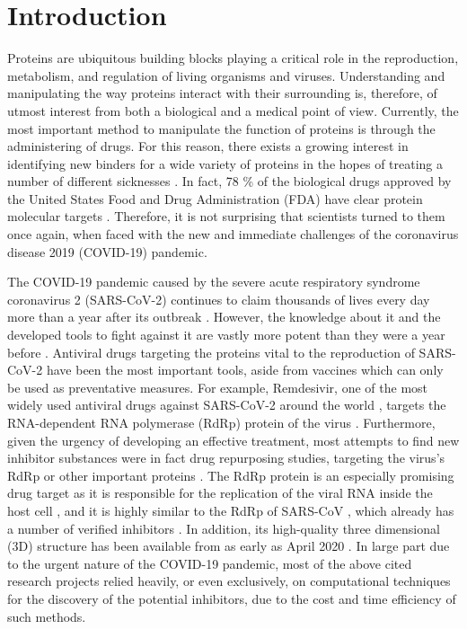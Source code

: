 \section{Introduction}

Proteins are ubiquitous building blocks playing a critical role in the reproduction, metabolism, and regulation of living organisms and viruses. Understanding and manipulating the way proteins interact with their surrounding is, therefore, of utmost interest from both a biological and a medical point of view. Currently, the most important method to manipulate the function of proteins is through the administering of drugs. For this reason, there exists a growing interest in identifying new binders for a wide variety of proteins in the hopes of treating a number of different sicknesses \cite{24clusters-vina,clusters_vina2,ensemble_screening,autodock_screen,tubercolosis_screen,cancer_inhibitor, vina_theory_practice}. In fact, 78 \% of the biological drugs approved by the United States Food and Drug Administration (FDA) have clear protein molecular targets \cite{how_many_targets}. Therefore, it is not surprising that scientists turned to them once again, when faced with the new and immediate challenges of the coronavirus disease 2019 (COVID-19) pandemic.    

The COVID-19 pandemic caused by the severe acute respiratory syndrome coronavirus 2 (SARS-CoV-2) continues to claim thousands of lives every day more than a year after its outbreak \cite{owidcoronavirus}.
However, the knowledge about it and the developed tools to fight against it are vastly more potent than they were a year before \cite{covid_review}.
Antiviral drugs targeting the proteins vital to the reproduction of SARS-CoV-2 have been the most important tools, aside from vaccines which can only be used as preventative measures.
For example, Remdesivir, one of the most widely used antiviral drugs against SARS-CoV-2 around the world \cite{remdesivir_meta}, targets the RNA-dependent RNA polymerase (RdRp) protein of the virus \cite{remdesivir_final}.
Furthermore, given the urgency of developing an effective treatment, most attempts to find new inhibitor substances were in fact drug repurposing studies, targeting the virus's RdRp \cite{rdrp,rdrp_virtual_screening,rdrp_virtual_screening2,rdrp_virtual_screening3,ml_inhibitors} or other important proteins \cite{ensemble_3clpro,main_protease_vs,3covid_proteins,papain-like}.
The RdRp protein is an especially promising drug target as it is responsible for the replication of the viral RNA inside the host cell \cite{rdrp_model}, and it is highly similar to the RdRp of SARS-CoV \cite{hcq_inhibitor}, which already has a number of verified inhibitors \cite{covid_proteins}. In addition, its high-quality three dimensional (3D) structure has been available from as early as April 2020 \cite{rdrp_structure}. In large part due to the urgent nature of the COVID-19 pandemic, most of the above cited research projects relied heavily, or even exclusively, on computational techniques for the discovery of the potential inhibitors, due to the cost and time efficiency of such methods.

